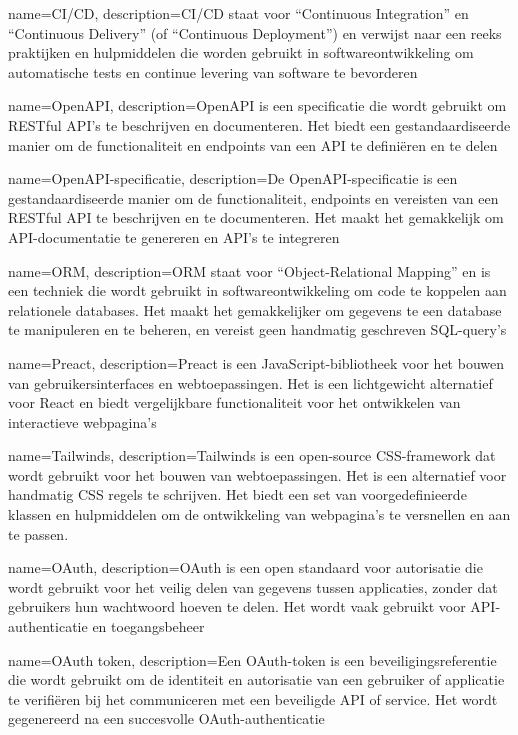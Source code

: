 {
    name=CI/CD,
    description={CI/CD staat voor ``Continuous Integration'' en ``Continuous Delivery'' (of ``Continuous Deployment'') en verwijst naar een reeks praktijken en hulpmiddelen die worden gebruikt in softwareontwikkeling om automatische tests en continue levering van software te bevorderen}
}

{
    name=OpenAPI,
    description={OpenAPI is een specificatie die wordt gebruikt om RESTful API's te beschrijven en documenteren. Het biedt een gestandaardiseerde manier om de functionaliteit en endpoints van een API te definiëren en te delen}
}

{
    name=OpenAPI-specificatie,
    description={De OpenAPI-specificatie is een gestandaardiseerde manier om de functionaliteit, endpoints en vereisten van een RESTful API te beschrijven en te documenteren. Het maakt het gemakkelijk om API-documentatie te genereren en API's te integreren}
}

{
    name=ORM,
    description={ORM staat voor ``Object-Relational Mapping'' en is een techniek die wordt gebruikt in softwareontwikkeling om code te koppelen aan relationele databases. Het maakt het gemakkelijker om gegevens te een database te manipuleren en te beheren, en vereist geen handmatig geschreven SQL-query's}
}

{
    name=Preact,
    description={Preact is een JavaScript-bibliotheek voor het bouwen van gebruikersinterfaces en webtoepassingen. Het is een lichtgewicht alternatief voor React en biedt vergelijkbare functionaliteit voor het ontwikkelen van interactieve webpagina's}
}

{
    name=Tailwinds,
    description={Tailwinds is een open-source CSS-framework dat wordt gebruikt voor het bouwen van webtoepassingen. Het is een alternatief voor handmatig CSS regels te schrijven. Het biedt een set van voorgedefinieerde klassen en hulpmiddelen om de ontwikkeling van webpagina's te versnellen en aan te passen.}
}

{
    name=OAuth,
    description={OAuth is een open standaard voor autorisatie die wordt gebruikt voor het veilig delen van gegevens tussen applicaties, zonder dat gebruikers hun wachtwoord hoeven te delen. Het wordt vaak gebruikt voor API-authenticatie en toegangsbeheer}
}

{
    name=OAuth token,
    description={Een OAuth-token is een beveiligingsreferentie die wordt gebruikt om de identiteit en autorisatie van een gebruiker of applicatie te verifiëren bij het communiceren met een beveiligde API of service. Het wordt gegenereerd na een succesvolle OAuth-authenticatie}
}

